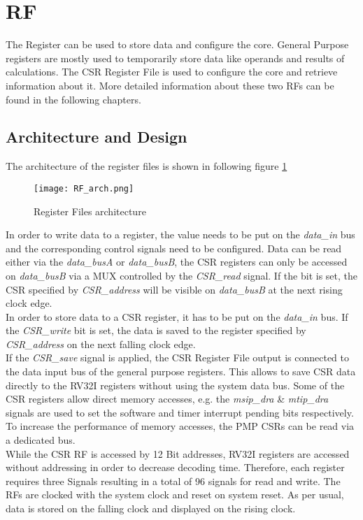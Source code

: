 \section{\acf{RF}}
The Register can be used to store data and configure the core. General Purpose
registers are mostly used to temporarily store data like operands and results of
calculations. The CSR Register File is used to configure the core and retrieve
information about it. More detailed information about these two RFs can be found in
the following chapters.
\clearpage
\subsection{Architecture and Design}
The architecture of the register files is shown in following figure \ref{fig:RF_arch}

\begin{figure}[H]
	\centering
	\texttt{[image: RF\_arch.png]}
	\caption{Register Files architecture}
	\label{fig:RF_arch}
\end{figure}

In order to write data to a register, the value needs to be put on the \textit{data\_in} bus and the corresponding control signals need to be configured. Data can be read either via the \textit{data\_busA} or \textit{data\_busB}, the CSR registers can only be accessed on \textit{data\_busB} via a MUX controlled by the \textit{CSR\_read} signal. If the bit is set, the CSR specified by \textit{CSR\_address} will be visible on \textit{data\_busB} at the next rising clock edge.\\
In order to store data to a CSR register, it has to be put on the \textit{data\_in} bus. If the \textit{CSR\_write} bit is set, the data is saved to the register specified by \textit{CSR\_address} on the next falling clock edge.\\
If the \textit{CSR\_save} signal is applied, the CSR Register File output is connected to the data input bus of the general purpose registers. This allows to save CSR data directly to the RV32I registers without using the system data bus. Some of the CSR registers allow direct memory accesses, e.g. the \textit{msip\_dra} \& \textit{mtip\_dra} signals are used to set the software and timer interrupt pending bits respectively. To increase the performance of memory accesses, the PMP CSRs can be read via a dedicated bus.\\
While the CSR RF is accessed by 12 Bit addresses, RV32I registers are accessed without addressing in order to decrease decoding time. Therefore, each register requires three Signals resulting in a total of 96 signals for read and write. The RFs are clocked with the system clock and reset on system reset. As per usual, data is stored on the falling clock and displayed on the rising clock.
